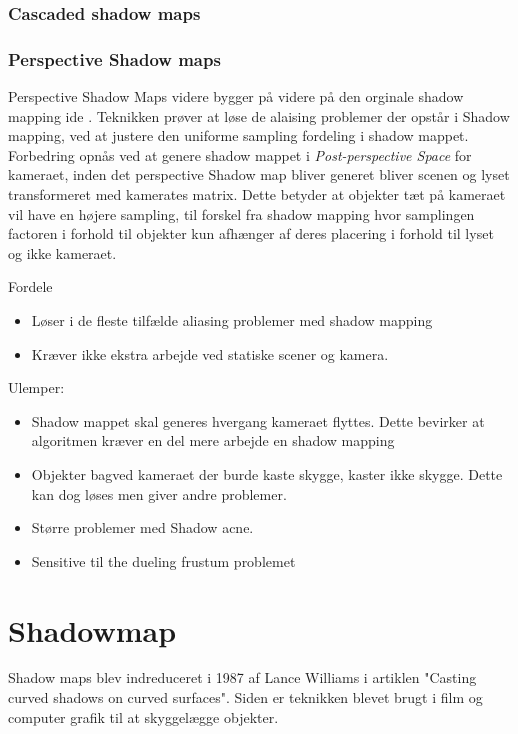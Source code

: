 \documentclass[11pt,a4paper]{article}
\begin{document}
\subsubsection{Cascaded shadow maps}


\subsubsection{Perspective Shadow maps}

Perspective Shadow Maps videre bygger på videre på den orginale shadow mapping ide \cite{SMAP}. Teknikken prøver at løse de alaising problemer der opstår i Shadow mapping, ved at justere den uniforme sampling fordeling i shadow mappet. Forbedring opnås ved at genere shadow mappet i \textit{Post-perspective Space} for kameraet, inden det perspective Shadow map bliver generet bliver scenen og lyset transformeret med kamerates matrix. Dette betyder at objekter tæt på kameraet vil have en højere sampling, til forskel fra shadow mapping hvor samplingen factoren i forhold til objekter kun afhænger af deres placering i forhold til lyset og ikke kameraet.


Fordele
\begin{itemize}
  \item Løser i de fleste tilfælde aliasing problemer med shadow mapping
  \item Kræver ikke ekstra arbejde ved statiske scener og kamera.
\end{itemize}

Ulemper:
\begin{itemize}
  \item Shadow mappet skal generes  hvergang kameraet flyttes. Dette bevirker at algoritmen kræver en del mere arbejde en shadow mapping
  \item Objekter bagved kameraet der burde kaste skygge, kaster ikke skygge. Dette kan dog løses men giver andre problemer.
  \item Større problemer med Shadow acne.
  \item	Sensitive til the dueling frustum problemet
\end{itemize}




\newpage 
\section{Shadowmap}

Shadow maps blev indreduceret i 1987 af Lance Williams i artiklen "Casting curved shadows on curved surfaces". Siden er teknikken blevet brugt i film og computer grafik til at skyggelægge objekter.
\end{document}
